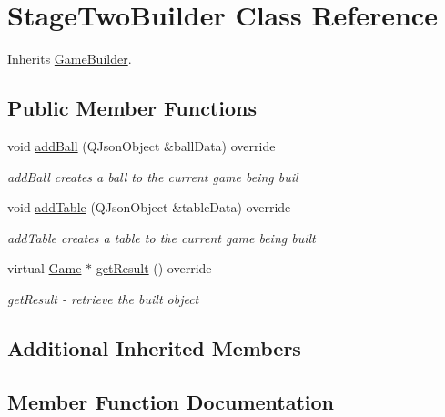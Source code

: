 \hypertarget{class_stage_two_builder}{}\section{Stage\+Two\+Builder Class Reference}
\label{class_stage_two_builder}


Inherits \mbox{\hyperlink{class_game_builder}{Game\+Builder}}.

\subsection*{Public Member Functions}
\begin{DoxyCompactItemize}
\item 
void \mbox{\hyperlink{class_stage_two_builder_a8b2b783294c26b5f40d16bdd54d86301}{add\+Ball}} (Q\+Json\+Object \&ball\+Data) override
\begin{DoxyCompactList}\small\item\em add\+Ball creates a ball to the current game being buil \end{DoxyCompactList}\item 
void \mbox{\hyperlink{class_stage_two_builder_a7326ee514e752cab6d994352f5ef68e0}{add\+Table}} (Q\+Json\+Object \&table\+Data) override
\begin{DoxyCompactList}\small\item\em add\+Table creates a table to the current game being built \end{DoxyCompactList}\item 
virtual \mbox{\hyperlink{class_game}{Game}} $\ast$ \mbox{\hyperlink{class_stage_two_builder_ac40c00c49b18b7c4f83f4474a8cd9c73}{get\+Result}} () override
\begin{DoxyCompactList}\small\item\em get\+Result -\/ retrieve the built object \end{DoxyCompactList}\end{DoxyCompactItemize}
\subsection*{Additional Inherited Members}


\subsection{Member Function Documentation}
\mbox{\label{class_stage_two_builder_a8b2b783294c26b5f40d16bdd54d86301}} 
